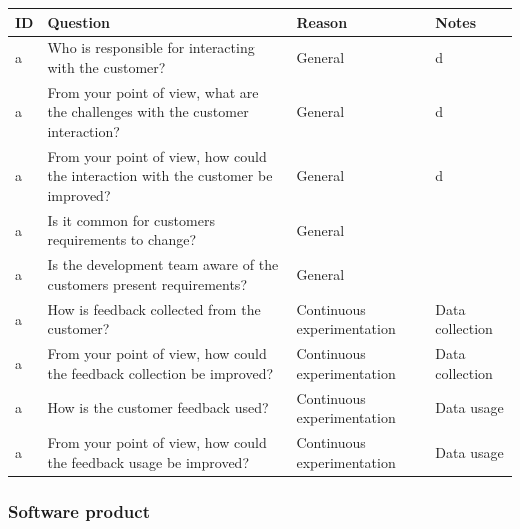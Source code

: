 \documentclass[english]{tktltiki2}
\theoremstyle{definition}
\theoremstyle{remark}
\begin{document}
\begin{center}
    \begin{tabular}{ | l | l | l | p{5cm} |}
    \hline
    ID & Question & Reason & Notes \\ \hline
    a & Who is responsible for interacting with the customer? & General & d \\ \hline
    a & From your point of view, what are the challenges with the customer interaction? & General & d \\ \hline
    a & From your point of view, how could the interaction with the customer be improved? & General & d \\ \hline
	a & Is it common for customers requirements to change? & General &  \\ \hline
    a & Is the development team aware of the customers present requirements? & General &  \\ \hline

	a & How is feedback collected from the customer? & Continuous experimentation & Data collection \\ \hline
	a & From your point of view, how could the feedback collection be improved? & Continuous experimentation & Data collection \\ \hline
	a & How is the customer feedback used? & Continuous experimentation & Data usage \\ \hline	
	a & From your point of view, how could the feedback usage be improved? & Continuous experimentation & Data usage \\ \hline

    \hline
    \end{tabular}
\end{center}

\subsubsection{Software product}
\end{document}
